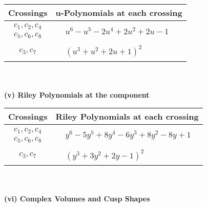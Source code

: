 \documentclass[1p]{elsarticle_modified}
\theoremstyle{definition}
\begin{document}
\begin{tabular}{m{50pt}|m{274pt}}
Crossings & \hspace{64pt}u-Polynomials at each crossing \\
\hline $$\begin{aligned}c_{1},c_{2},c_{4}\\c_{5},c_{6},c_{8}\end{aligned}$$&$\begin{aligned}
&u^6- u^5-2 u^4+2 u^2+2 u-1
\end{aligned}$\\
\hline $$\begin{aligned}c_{3},c_{7}\end{aligned}$$&$\begin{aligned}
&(u^3+u^2+2 u+1)^2
\end{aligned}$\\
\hline
\end{tabular}\\~\\
\newpage\renewcommand{\arraystretch}{1}
\flushleft \textbf{(v) Riley Polynomials at the component}\newline \\
\begin{tabular}{m{50pt}|m{274pt}}
Crossings & \hspace{64pt}Riley Polynomials at each crossing \\
\hline $$\begin{aligned}c_{1},c_{2},c_{4}\\c_{5},c_{6},c_{8}\end{aligned}$$&$\begin{aligned}
&y^6-5 y^5+8 y^4-6 y^3+8 y^2-8 y+1
\end{aligned}$\\
\hline $$\begin{aligned}c_{3},c_{7}\end{aligned}$$&$\begin{aligned}
&(y^3+3 y^2+2 y-1)^2
\end{aligned}$\\
\hline
\end{tabular}\\~\\
\newpage\flushleft \textbf{(vi) Complex Volumes and Cusp Shapes}
\end{document}
